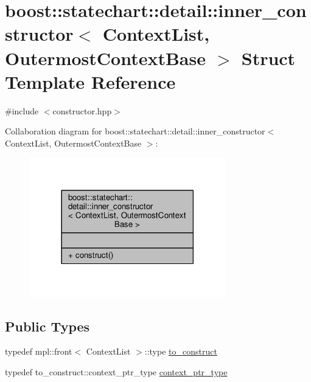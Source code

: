 \hypertarget{structboost_1_1statechart_1_1detail_1_1inner__constructor}{}\section{boost\+:\+:statechart\+:\+:detail\+:\+:inner\+\_\+constructor$<$ Context\+List, Outermost\+Context\+Base $>$ Struct Template Reference}
\label{structboost_1_1statechart_1_1detail_1_1inner__constructor}


{\ttfamily \#include $<$constructor.\+hpp$>$}



Collaboration diagram for boost\+:\+:statechart\+:\+:detail\+:\+:inner\+\_\+constructor$<$ Context\+List, Outermost\+Context\+Base $>$\+:
\nopagebreak
\begin{figure}[H]
\begin{center}
\leavevmode
\includegraphics[width=242pt]{structboost_1_1statechart_1_1detail_1_1inner__constructor__coll__graph}
\end{center}
\end{figure}
\subsection*{Public Types}
\begin{DoxyCompactItemize}
\item 
typedef mpl\+::front$<$ Context\+List $>$\+::type \mbox{\hyperlink{structboost_1_1statechart_1_1detail_1_1inner__constructor_a66070519599355beff83fce685019f14}{to\+\_\+construct}}
\item 
typedef to\+\_\+construct\+::context\+\_\+ptr\+\_\+type \mbox{\hyperlink{structboost_1_1statechart_1_1detail_1_1inner__constructor_ac79b48ef3b5aaf594f039305a9925aeb}{context\+\_\+ptr\+\_\+type}}
\end{DoxyCompactItemize}

